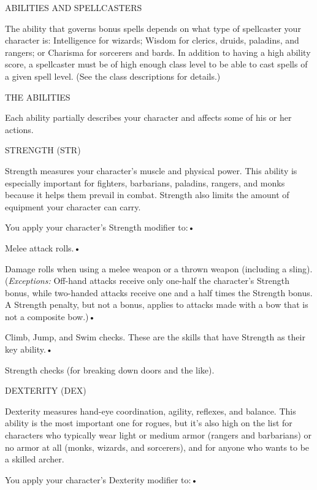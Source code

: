 \documentclass{article}
\begin{document}
\vspace{12pt}
ABILITIES AND SPELLCASTERS

The ability that governs bonus spells depends on what type of spellcaster your 
character is: Intelligence for wizards; Wisdom for clerics, druids, paladins, and 
rangers; or Charisma for sorcerers and bards. In addition to having a high ability 
score, a spellcaster must be of high enough class level to be able to cast spells 
of a given spell level. (See the class descriptions for details.)

\vspace{12pt}
{\LARGE{}THE ABILITIES}

Each ability partially describes your character and affects some of his or her 
actions.

\vspace{12pt}
STRENGTH (STR)

Strength measures your character's muscle and physical power. This ability is especially 
important for fighters, barbarians, paladins, rangers, and monks because it helps 
them prevail in combat. Strength also limits the amount of equipment your character 
can carry.

You apply your character's Strength modifier to:• 

\parindent=3pt
Melee attack rolls.• 

Damage rolls when using a melee weapon or a thrown weapon (including a sling). 
(\textit{Exceptions: }Off-hand attacks receive only one-half the character's Strength 
bonus, while two-handed attacks receive one and a half times the Strength bonus. 
A Strength penalty, but not a bonus, applies to attacks made with a bow that is 
not a composite bow.)• 

Climb, Jump, and Swim checks. These are the skills that have Strength as their 
key ability.• 

\parindent=7pt
Strength checks (for breaking down doors and the like).

\vspace{12pt}
\parindent=0pt
DEXTERITY (DEX)

Dexterity measures hand-eye coordination, agility, reflexes, and balance. This 
ability is the most important one for rogues, but it's also high on the list for 
characters who typically wear light or medium armor (rangers and barbarians) or 
no armor at all (monks, wizards, and sorcerers), and for anyone who wants to be 
a skilled archer.

You apply your character's Dexterity modifier to:• 
\end{document}
